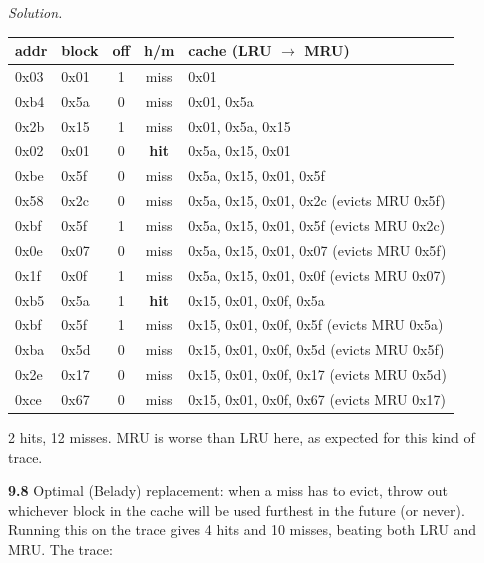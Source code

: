 \documentclass[12pt]{article}
\newenvironment{solution}{\par\noindent\textit{Solution.}\ }{\par\vspace{1.1em}}
\newcommand{\subproblem}[1]{\par\vspace{0.45em}\noindent\textbf{#1}\quad}
\begin{document}
\begin{solution}
\begin{center}\small
\begin{tabular}{@{}llccl@{}}\toprule
addr & block & off & h/m & cache (LRU $\to$ MRU) \\\midrule
0x03 & 0x01 & 1 & miss & 0x01 \\
0xb4 & 0x5a & 0 & miss & 0x01, 0x5a \\
0x2b & 0x15 & 1 & miss & 0x01, 0x5a, 0x15 \\
0x02 & 0x01 & 0 & \textbf{hit}  & 0x5a, 0x15, 0x01 \\
0xbe & 0x5f & 0 & miss & 0x5a, 0x15, 0x01, 0x5f \\
0x58 & 0x2c & 0 & miss & 0x5a, 0x15, 0x01, 0x2c (evicts MRU 0x5f) \\
0xbf & 0x5f & 1 & miss & 0x5a, 0x15, 0x01, 0x5f (evicts MRU 0x2c) \\
0x0e & 0x07 & 0 & miss & 0x5a, 0x15, 0x01, 0x07 (evicts MRU 0x5f) \\
0x1f & 0x0f & 1 & miss & 0x5a, 0x15, 0x01, 0x0f (evicts MRU 0x07) \\
0xb5 & 0x5a & 1 & \textbf{hit}  & 0x15, 0x01, 0x0f, 0x5a \\
0xbf & 0x5f & 1 & miss & 0x15, 0x01, 0x0f, 0x5f (evicts MRU 0x5a) \\
0xba & 0x5d & 0 & miss & 0x15, 0x01, 0x0f, 0x5d (evicts MRU 0x5f) \\
0x2e & 0x17 & 0 & miss & 0x15, 0x01, 0x0f, 0x17 (evicts MRU 0x5d) \\
0xce & 0x67 & 0 & miss & 0x15, 0x01, 0x0f, 0x67 (evicts MRU 0x17) \\
\bottomrule\end{tabular}\end{center}
2 hits, 12 misses. MRU is worse than LRU here, as expected for this kind of trace.

\subproblem{9.8} Optimal (Belady) replacement: when a miss has to evict, throw out whichever block in the cache will be used furthest in the future (or never). Running this on the trace gives 4 hits and 10 misses, beating both LRU and MRU. The trace:


\end{solution}
\end{document}
